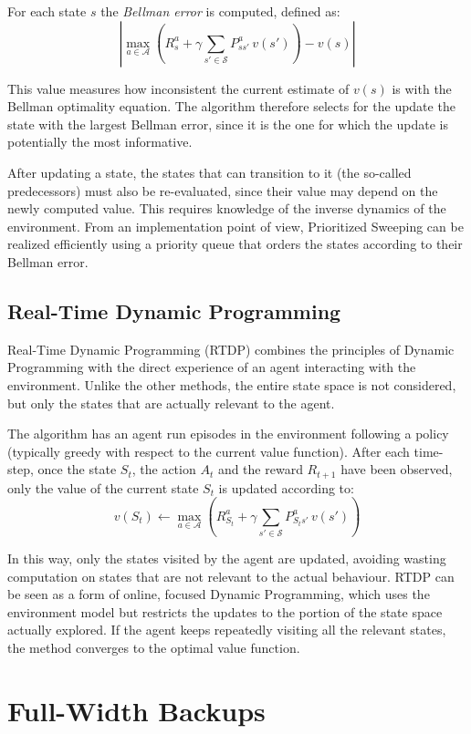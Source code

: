 For each state $s$ the \emph{Bellman error} is computed, defined as:
\[
\left| \max_{a \in \mathcal{A}} \left( R_s^a + \gamma \sum_{s' \in \mathcal{S}} P_{ss'}^a \, v(s') \right) - v(s) \right|
\]

This value measures how inconsistent the current estimate of $v(s)$ is with the Bellman optimality equation. The algorithm therefore selects for the update the state with the largest Bellman error, since it is the one for which the update is potentially the most informative.

After updating a state, the states that can transition to it (the so-called predecessors) must also be re-evaluated, since their value may depend on the newly computed value. This requires knowledge of the inverse dynamics of the environment. From an implementation point of view, Prioritized Sweeping can be realized efficiently using a priority queue that orders the states according to their Bellman error.


\subsection{Real-Time Dynamic Programming}

Real-Time Dynamic Programming (RTDP) combines the principles of Dynamic Programming with the direct experience of an agent interacting with the environment. Unlike the other methods, the entire state space is not considered, but only the states that are actually relevant to the agent.

The algorithm has an agent run episodes in the environment following a policy (typically greedy with respect to the current value function). After each time-step, once the state $S_t$, the action $A_t$ and the reward $R_{t+1}$ have been observed, only the value of the current state $S_t$ is updated according to:
\[
v(S_t) \leftarrow \max_{a \in \mathcal{A}} \left( R_{S_t}^a + \gamma \sum_{s' \in \mathcal{S}} P_{S_t s'}^a \, v(s') \right)
\]

In this way, only the states visited by the agent are updated, avoiding wasting computation on states that are not relevant to the actual behaviour. RTDP can be seen as a form of online, focused Dynamic Programming, which uses the environment model but restricts the updates to the portion of the state space actually explored. If the agent keeps repeatedly visiting all the relevant states, the method converges to the optimal value function.

\section{Full-Width Backups}

